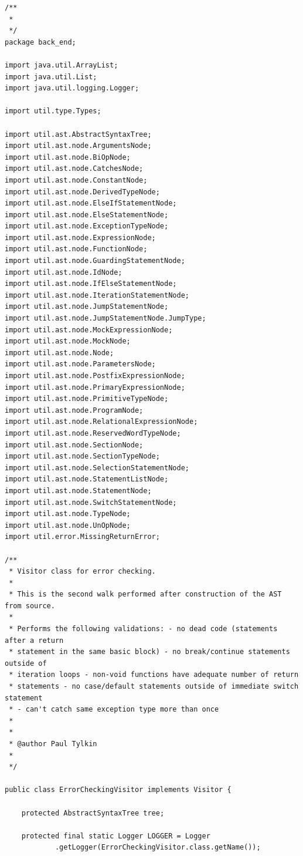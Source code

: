 \documentclass{report}
\begin{document}
\begin{verbatim}
/**
 * 
 */
package back_end;

import java.util.ArrayList;
import java.util.List;
import java.util.logging.Logger;

import util.type.Types;

import util.ast.AbstractSyntaxTree;
import util.ast.node.ArgumentsNode;
import util.ast.node.BiOpNode;
import util.ast.node.CatchesNode;
import util.ast.node.ConstantNode;
import util.ast.node.DerivedTypeNode;
import util.ast.node.ElseIfStatementNode;
import util.ast.node.ElseStatementNode;
import util.ast.node.ExceptionTypeNode;
import util.ast.node.ExpressionNode;
import util.ast.node.FunctionNode;
import util.ast.node.GuardingStatementNode;
import util.ast.node.IdNode;
import util.ast.node.IfElseStatementNode;
import util.ast.node.IterationStatementNode;
import util.ast.node.JumpStatementNode;
import util.ast.node.JumpStatementNode.JumpType;
import util.ast.node.MockExpressionNode;
import util.ast.node.MockNode;
import util.ast.node.Node;
import util.ast.node.ParametersNode;
import util.ast.node.PostfixExpressionNode;
import util.ast.node.PrimaryExpressionNode;
import util.ast.node.PrimitiveTypeNode;
import util.ast.node.ProgramNode;
import util.ast.node.RelationalExpressionNode;
import util.ast.node.ReservedWordTypeNode;
import util.ast.node.SectionNode;
import util.ast.node.SectionTypeNode;
import util.ast.node.SelectionStatementNode;
import util.ast.node.StatementListNode;
import util.ast.node.StatementNode;
import util.ast.node.SwitchStatementNode;
import util.ast.node.TypeNode;
import util.ast.node.UnOpNode;
import util.error.MissingReturnError;

/**
 * Visitor class for error checking.
 * 
 * This is the second walk performed after construction of the AST from source.
 * 
 * Performs the following validations: - no dead code (statements after a return
 * statement in the same basic block) - no break/continue statements outside of
 * iteration loops - non-void functions have adequate number of return
 * statements - no case/default statements outside of immediate switch statement
 * - can't catch same exception type more than once
 * 
 * 
 * @author Paul Tylkin
 * 
 */

public class ErrorCheckingVisitor implements Visitor {

	protected AbstractSyntaxTree tree;

	protected final static Logger LOGGER = Logger
			.getLogger(ErrorCheckingVisitor.class.getName());


\end{verbatim}
\end{document}
